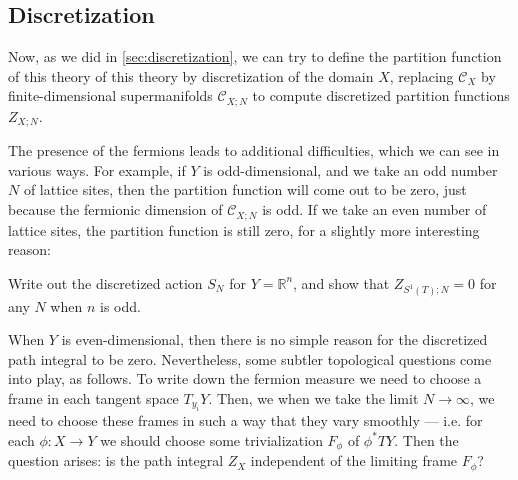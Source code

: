 \documentclass[12pt,letterpaper,reqno]{article}
\numberwithin{equation}{section}
\newcommand{\cC}{\ensuremath{\mathcal C}}
\newcommand{\R}{\ensuremath{\mathbb R}}
\DeclareMathOperator{\Spin}{Spin}
\DeclareMathOperator{\SO}{SO}
\newcommand{\fixme}[1]{{\color{orange}{[#1]}}}
\begin{document}
\subsection{Discretization} \label{sec:susy-discretization}

Now, as we did in \autoref{sec:discretization}, 
we can try to define the partition 
function of this theory of this theory by discretization of the
domain $X$, replacing $\cC_X$ by finite-dimensional supermanifolds
$\cC_{X;N}$ to compute discretized partition functions $Z_{X;N}$.

The presence of the fermions leads to additional difficulties,
which we can see in various ways. For example, if $Y$ is
odd-dimensional, and we take an odd number $N$ of lattice sites,
then the partition function will come out to be zero, just because
the fermionic dimension of $\cC_{X;N}$ is odd. If we take an even
number of lattice sites, the partition function is still zero, for
a slightly more interesting reason:
\begin{exercise} Write out the discretized action $S_N$
for $Y = \R^n$, and show that $Z_{S^1(T);N} = 0$ 
for any $N$ when $n$ is odd.
\end{exercise}
When $Y$ is even-dimensional, then there is no simple reason
for the discretized path integral to be zero.
Nevertheless, some subtler topological questions come into play, 
as follows.
To write down the
fermion measure we need to choose a frame
in each tangent space $T_{y_i} Y$.
Then, we when we take the limit $N \to \infty$, we need 
to choose these frames in such a way that they vary smoothly ---
i.e. for each $\phi: X \to Y$ we should choose some trivialization $F_\phi$
of $\phi^* TY$.
Then the question arises: is the path integral $Z_{X}$ 
independent of the limiting frame $F_\phi$?
\fixme{..}

\end{document}
